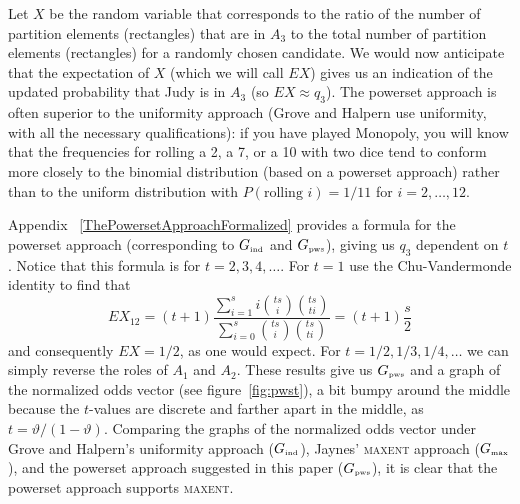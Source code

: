 \documentclass[smallextended]{svjour3}       %
\newcommand{\qvu}[0]{\vartheta}
\begin{document}
Let $X$ be the random variable that corresponds to the ratio of the
number of partition elements (rectangles) that are in $A_{3}$ to the
total number of partition elements (rectangles) for a randomly chosen
candidate. We would now anticipate that the expectation of $X$ (which
we will call $EX$) gives us an indication of the updated probability
that Judy is in $A_{3}$ (so $EX\approx{}q_{3}$). The powerset approach
is often superior to the uniformity approach (Grove and Halpern use
uniformity, with all the necessary qualifications): if you have played
Monopoly, you will know that the frequencies for rolling a 2, a 7, or
a 10 with two dice tend to conform more closely to the binomial
distribution (based on a powerset approach) rather than to the uniform
distribution with $P(\mbox{rolling }i)=1/11$ for $i=2,{\ldots},12$.

Appendix ~\ref{ThePowersetApproachFormalized} provides a formula for
the powerset approach (corresponding to $G_{\mbox{\tiny ind}}$ and
$G_{\mbox{\tiny pws}}$), giving us $q_{3}$ dependent on $t$. Notice
that this formula is for $t=2,3,4,\ldots$. For $t=1$ use the
Chu-Vandermonde identity to find that
\begin{displaymath}
  EX_{12}=(t+1)\frac{\sum_{i=1}^{s}i\binom{ts}{i}\binom{ts}{ti}}{\sum_{i=0}^{s}\binom{ts}{i}\binom{ts}{ti}}=(t+1)\frac{s}{2}  
\end{displaymath}
and consequently $EX=1/2$, as one would expect. For
$t=1/2,1/3,1/4,\ldots$ we can simply reverse the roles of $A_{1}$ and
$A_{2}$. These results give us $G_{\mbox{\tiny pws}}$ and a graph of
the normalized odds vector (see figure~\ref{fig:pwst}), a bit bumpy
around the middle because the $t$-values are discrete and farther
apart in the middle, as $t={\qvu}/(1-{\qvu})$. Comparing the graphs of
the normalized odds vector under Grove and Halpern's uniformity
approach ($G_{\mbox{\tiny ind}}$), Jaynes' \textsc{maxent} approach
($G_{\mbox{\tiny max}}$), and the powerset approach suggested in this
paper ($G_{\mbox{\tiny pws}}$), it is clear that the powerset approach
supports \textsc{maxent}.
\end{document}
